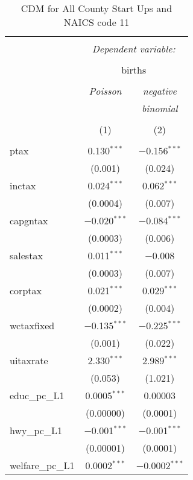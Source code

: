 
\begin{table}[!htbp] \centering 
  \caption{CDM for All County Start Ups and NAICS code 11} 
  \label{} 
\begin{tabular}{@{\extracolsep{5pt}}lcc} 
\\[-1.8ex]\hline 
\hline \\[-1.8ex] 
 & \multicolumn{2}{c}{\textit{Dependent variable:}} \\ 
\cline{2-3} 
\\[-1.8ex] & \multicolumn{2}{c}{births} \\ 
\\[-1.8ex] & \textit{Poisson} & \textit{negative} \\ 
 & \textit{} & \textit{binomial} \\ 
\\[-1.8ex] & (1) & (2)\\ 
\hline \\[-1.8ex] 
 ptax & 0.130$^{***}$ & $-$0.156$^{***}$ \\ 
  & (0.001) & (0.024) \\ 
  inctax & 0.024$^{***}$ & 0.062$^{***}$ \\ 
  & (0.0004) & (0.007) \\ 
  capgntax & $-$0.020$^{***}$ & $-$0.084$^{***}$ \\ 
  & (0.0003) & (0.006) \\ 
  salestax & 0.011$^{***}$ & $-$0.008 \\ 
  & (0.0003) & (0.007) \\ 
  corptax & 0.021$^{***}$ & 0.029$^{***}$ \\ 
  & (0.0002) & (0.004) \\ 
  wctaxfixed & $-$0.135$^{***}$ & $-$0.225$^{***}$ \\ 
  & (0.001) & (0.022) \\ 
  uitaxrate & 2.330$^{***}$ & 2.989$^{***}$ \\ 
  & (0.053) & (1.021) \\ 
  educ\_pc\_L1 & 0.0005$^{***}$ & 0.00003 \\ 
  & (0.00000) & (0.0001) \\ 
  hwy\_pc\_L1 & $-$0.001$^{***}$ & $-$0.001$^{***}$ \\ 
  & (0.00001) & (0.0001) \\ 
  welfare\_pc\_L1 & 0.0002$^{***}$ & $-$0.0002$^{***}$ \\ 

\end{tabular}
\end{table}

